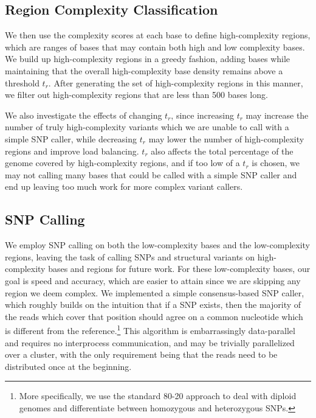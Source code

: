 \documentclass[10pt]{article}
\newcommand\TODO[1]{\textcolor{red}{TODO: #1}}
\begin{document}

\subsection{Region Complexity Classification}

We then use the complexity scores at each base to define high-complexity regions, which are ranges of bases that may contain both high and low complexity bases.
We build up high-complexity regions in a greedy fashion, adding bases while maintaining that the overall high-complexity base density remains above a threshold $t_r$.
After generating the set of high-complexity regions in this manner, we filter out high-complexity regions that are less than 500 bases long.

We also investigate the effects of changing $t_r$, since increasing $t_r$ may increase the number of truly high-complexity variants which we are unable to call with a simple SNP caller, while decreasing $t_r$ may lower the number of high-complexity regions and improve load balancing.
$t_r$ also affects the total percentage of the genome covered by high-complexity regions, and if too low of a $t_r$ is chosen, we may not calling many bases that could be called with a simple SNP caller and end up leaving too much work for more complex variant callers.


\subsection{SNP Calling}

We employ SNP calling on both the low-complexity bases and the low-complexity regions, leaving the task of calling SNPs and structural variants on high-complexity bases and regions for future work.
For these low-complexity bases, our goal is speed and accuracy, which are easier to attain since we are skipping any region we deem complex.
We implemented a simple consensus-based SNP caller, which roughly builds on the intuition that if a SNP exists, then the majority of the reads which cover that position should agree on a common nucleotide which is different from the reference.\footnote{More specifically, we use the standard 80-20 approach \cite{gatk} to deal with diploid genomes and differentiate between homozygous and heterozygous SNPs.}
This algorithm is embarrassingly data-parallel and requires no interprocess communication, and may be trivially parallelized over a cluster, with the only requirement being that the reads need to be distributed once at the beginning.
\end{document}
